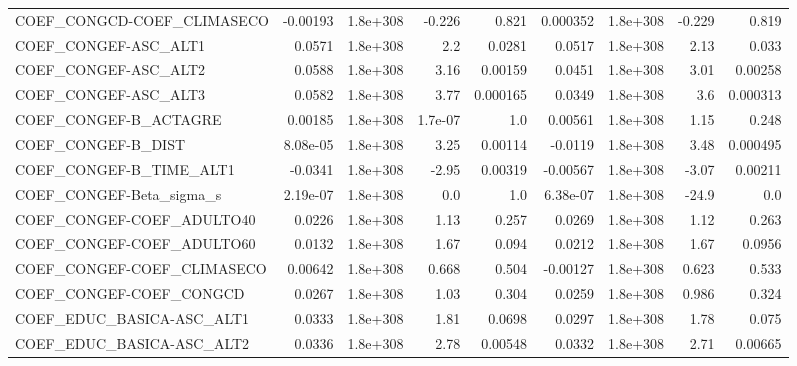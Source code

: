 \begin{tabular}{lrrrrrrrr}
COEF\_CONGCD-COEF\_CLIMASECO        &    -0.00193 &     1.8e+308 &    -0.226 &    0.821 &   0.000352 &    1.8e+308 &       -0.229 &         0.819 \\
COEF\_CONGEF-ASC\_ALT1              &      0.0571 &     1.8e+308 &       2.2 &   0.0281 &     0.0517 &    1.8e+308 &         2.13 &         0.033 \\
COEF\_CONGEF-ASC\_ALT2              &      0.0588 &     1.8e+308 &      3.16 &  0.00159 &     0.0451 &    1.8e+308 &         3.01 &       0.00258 \\
COEF\_CONGEF-ASC\_ALT3              &      0.0582 &     1.8e+308 &      3.77 & 0.000165 &     0.0349 &    1.8e+308 &          3.6 &      0.000313 \\
COEF\_CONGEF-B\_ACTAGRE             &     0.00185 &     1.8e+308 &   1.7e-07 &      1.0 &    0.00561 &    1.8e+308 &         1.15 &         0.248 \\
COEF\_CONGEF-B\_DIST                &    8.08e-05 &     1.8e+308 &      3.25 &  0.00114 &    -0.0119 &    1.8e+308 &         3.48 &      0.000495 \\
COEF\_CONGEF-B\_TIME\_ALT1           &     -0.0341 &     1.8e+308 &     -2.95 &  0.00319 &   -0.00567 &    1.8e+308 &        -3.07 &       0.00211 \\
COEF\_CONGEF-Beta\_sigma\_s          &    2.19e-07 &     1.8e+308 &       0.0 &      1.0 &   6.38e-07 &    1.8e+308 &        -24.9 &           0.0 \\
COEF\_CONGEF-COEF\_ADULTO40         &      0.0226 &     1.8e+308 &      1.13 &    0.257 &     0.0269 &    1.8e+308 &         1.12 &         0.263 \\
COEF\_CONGEF-COEF\_ADULTO60         &      0.0132 &     1.8e+308 &      1.67 &    0.094 &     0.0212 &    1.8e+308 &         1.67 &        0.0956 \\
COEF\_CONGEF-COEF\_CLIMASECO        &     0.00642 &     1.8e+308 &     0.668 &    0.504 &   -0.00127 &    1.8e+308 &        0.623 &         0.533 \\
COEF\_CONGEF-COEF\_CONGCD           &      0.0267 &     1.8e+308 &      1.03 &    0.304 &     0.0259 &    1.8e+308 &        0.986 &         0.324 \\
COEF\_EDUC\_BASICA-ASC\_ALT1         &      0.0333 &     1.8e+308 &      1.81 &   0.0698 &     0.0297 &    1.8e+308 &         1.78 &         0.075 \\
COEF\_EDUC\_BASICA-ASC\_ALT2         &      0.0336 &     1.8e+308 &      2.78 &  0.00548 &     0.0332 &    1.8e+308 &         2.71 &       0.00665 \\

\end{tabular}
